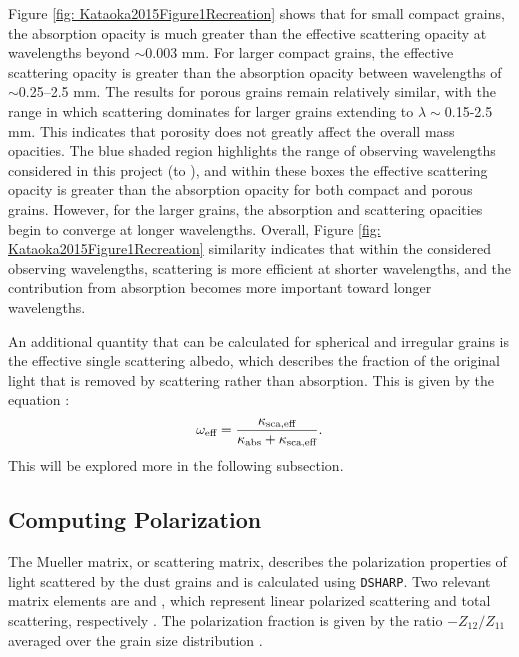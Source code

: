 Figure \ref{fig: Kataoka2015Figure1Recreation} shows that for small compact grains, the absorption opacity is much greater than the effective scattering opacity at wavelengths beyond $\sim$0.003 mm. For larger compact grains, the effective scattering opacity is greater than the absorption opacity between wavelengths of $\sim$0.25--2.5 mm. The results for porous grains remain relatively similar, with the range in which scattering dominates for larger grains extending to $\lambda\sim$0.15-2.5 mm. This indicates that porosity does not greatly affect the overall mass opacities. The blue shaded region highlights the range of observing wavelengths considered in this project (\bseven to \bfourNS), and within these boxes the effective scattering opacity is greater than the absorption opacity for both compact and porous grains. However, for the larger grains, the absorption and scattering opacities begin to converge at longer wavelengths. Overall, Figure \ref{fig: Kataoka2015Figure1Recreation} similarity indicates that within the considered observing wavelengths, scattering is more efficient at shorter wavelengths, and the contribution from absorption becomes more important toward longer wavelengths.






An additional quantity that can be calculated for spherical and irregular grains is the effective single scattering albedo, which describes the fraction of the original light that is removed by scattering rather than absorption. This is given by the equation \citep{Zhang2023}: 
\begin{equation}
    \omega_{\text{eff}} = \frac{\kappa_{\text{sca,eff}}}{\kappa_{\text{abs}} + \kappa_{\text{sca,eff}}}.
    \label{eq: omega}
\end{equation}
\noindent This will be explored more in the following subsection. 




\subsection{Computing Polarization}



The Mueller matrix, or scattering matrix, describes the polarization properties of light scattered by the dust grains \citep{Kataoka_2015} and is calculated using \texttt{DSHARP}. Two relevant matrix elements are \Zoo and \ZootNS, which represent linear polarized scattering and total scattering, respectively \citep{Zhang2023}. The polarization fraction is given by the ratio $-Z_{12}/Z_{11}$ averaged over the grain size distribution \citep{Kataoka_2015}. 

